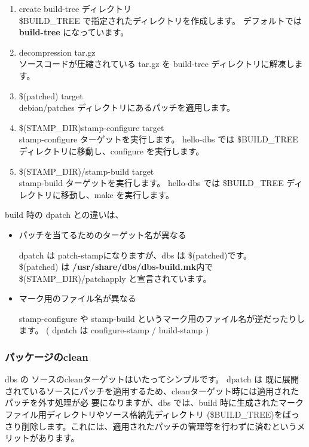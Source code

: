 \documentclass[mingoth,a4paper]{jsarticle}
\begin{document}
\begin{enumerate}
\item create build-tree ディレクトリ \\
	\$BUILD\_TREE で指定されたディレクトリを作成します。
	デフォルトでは {\bf build-tree} になっています。

\item decompression tar.gz \\
	ソースコードが圧縮されている tar.gz を build-tree ディレクトリに解凍します。

\item \$(patched) target  \\
	debian/patches ディレクトリにあるパッチを適用します。

\item \$(STAMP\_DIR)\/stamp-configure target \\
	stamp-configure ターゲットを実行します。
	hello-dbs では \$BUILD\_TREE ディレクトリに移動し、configure を実行します。

\item \$(STAMP\_DIR)/stamp-build target \\
	stamp-build ターゲットを実行します。
	hello-dbs では \$BUILD\_TREE ディレクトリに移動し、make を実行します。 
\end{enumerate}

build 時の dpatch との違いは、

\begin{itemize}
\item パッチを当てるためのターゲット名が異なる

	dpatch は patch-stampになりますが、dbs は \$(patched)です。\\
	\$(patched) は {\bf /usr/share/dbs/dbs-build.mk}内で \$(STAMP\_DIR)/patchapply と宣言されています。

\item マーク用のファイル名が異なる

	stamp-configure や stamp-build というマーク用のファイル名が逆だったりします。
	( dpatch は configure-stamp / build-stamp )
\end{itemize}


\subsubsection{パッケージのclean}
dbs の ソースのcleanターゲットはいたってシンプルです。
dpatch は 既に展開されているソースにパッチを適用するため、cleanターゲット時には適用されたパッチを外す処理が必
要になりますが、dbs では、build 時に生成されたマークファイル用ディレクトリやソース格納先ディレクトリ
(\$BUILD\_TREE)をばっさり削除します。これには、適用されたパッチの管理等を行わずに済むというメリットがあります。
\end{document}
